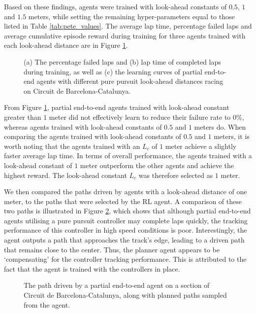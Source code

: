 Based on these findings, agents were trained with look-ahead constants of $0.5$, $1$ and $1.5$ meters, while setting the remaining hyper-parameters equal to those listed in Table \ref{tab:pete_values}.
The average lap time, percentage failed laps and average cumulative episode reward during training for three agents trained with each look-ahead distance are in Figure \ref{fig:lfc_curves}.

\begin{figure}[htb!]
    \centering
    
    \caption[Learning curves for tuning the steering controller look-ahead constant of a partial end-to-end agent]{(a) The percentage failed laps and (b) lap time of completed laps during training, as well as (c) the learning curves of partial end-to-end agents with different pure pursuit look-ahead distances racing on Circuit de Barcelona-Catalunya.}
    \label{fig:lfc_curves}
\end{figure}

From Figure \ref{fig:lfc_curves}, partial end-to-end agents trained with look-ahead constant greater than $1$ meter did not effectively learn to reduce their failure rate to $0\%$, whereas agents trained with  look-ahead constants of $0.5$ and $1$ meters do.
When comparing the agents trained with look-ahead constants of $0.5$ and $1$ meters, it is worth noting that the agents trained with an $L_c$ of $1$ meter achieve a slightly faster average lap time. 
In terms of overall performance, the agents trained with a look-ahead constant of $1$ meter outperform the other agents and achieve the highest reward.
The look-ahead constant $L_c$ was therefore selected as $1$ meter.

We then compared the paths driven by agents with a look-ahead distance of one meter, to the paths that were selected by the RL agent.
A comparison of these two paths is illustrated in Figure \ref{fig:lfc_paths}, which shows that
although partial end-to-end agents utilising a pure pursuit controller may complete laps quickly, 
the tracking performance of this controller in high speed conditions is poor.
Interestingly, the agent outputs a path that approaches the track's edge, leading to a driven path that remains close to the center.
Thus, the planner agent appears to be `compensating' for the controller tracking performance.
This is attributed to the fact that the agent is trained with the controllers in place.


\begin{figure}[htb!]
    \centering
    
    \caption[The path driven by a partial end-to-end agent on a section of Circuit de Barcelona-Catalunya]{The path driven by a partial end-to-end agent on a section of Circuit de Barcelona-Catalunya, along with planned paths sampled from the agent.}
    \label{fig:lfc_paths}
\end{figure}


